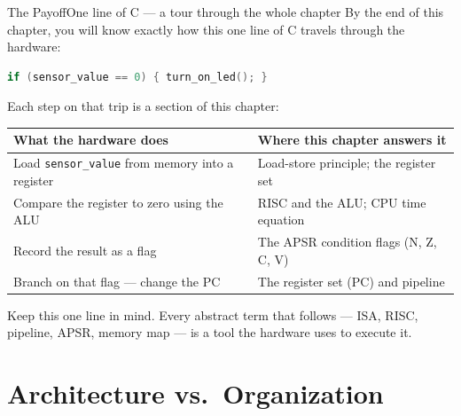 \documentclass[9pt,aspectratio=169,xcolor=table]{beamer}
\newcommand{\striped}{\rowcolors{1}{white}{stripe}}
\begin{document}
\begin{frame}[fragile]{The Payoff}{One line of C --- a tour through the whole chapter}
    \leavevmode
    By the end of this chapter, you will know \alert{exactly} how this one line of C travels through the hardware:

    \vspace{3mm}
    \begin{center}
    \begin{minipage}{.72\textwidth}
\begin{lstlisting}[language=C, basicstyle=\ttfamily\normalsize]
if (sensor_value == 0) { turn_on_led(); }
\end{lstlisting}
    \end{minipage}
    \end{center}

    \vspace{3mm}
    {\small Each step on that trip is a section of this chapter:}

    \vspace{1mm}
    \begin{center}
    {\small
    \striped
    \begin{tabular}{@{}l R{.60\textwidth}@{}}
        \toprule
        \textbf{What the hardware does} & \textbf{Where this chapter answers it} \\
        \midrule
        Load \texttt{sensor\_value} from memory into a register
            & Load-store principle; the register set \\
        Compare the register to zero using the ALU
            & RISC and the ALU; CPU time equation \\
        Record the result as a flag
            & The APSR condition flags (N, Z, C, V) \\
        Branch on that flag --- change the PC
            & The register set (PC) and pipeline \\
        \bottomrule
    \end{tabular}}
    \end{center}

    \vspace{1mm}
    {\small\centering Keep this one line in mind. Every abstract term that follows --- ISA, RISC, pipeline, APSR, memory map --- is a tool the hardware uses to execute it.\par}
\end{frame}

\section{Architecture vs.\ Organization}
\end{document}

